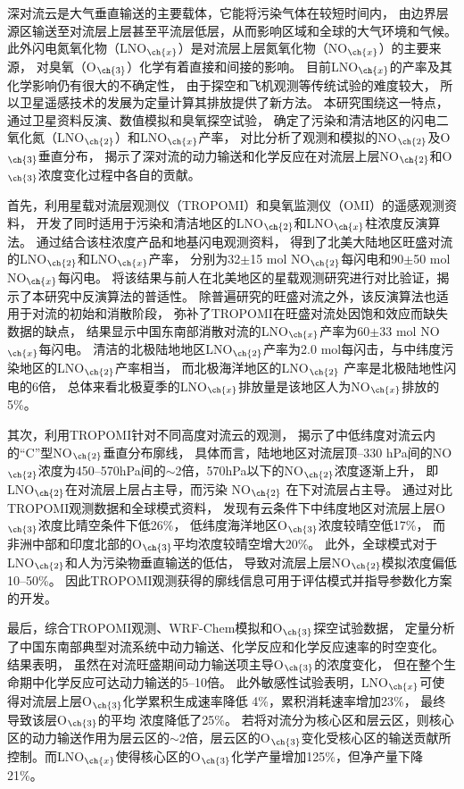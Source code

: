 
\abstract
{
深对流云是大气垂直输送的主要载体，它能将污染气体在较短时间内，
由边界层源区输送至对流层上层甚至平流层低层，从而影响区域和全球的大气环境和气候。
此外闪电氮氧化物（LNO$_{\ch{x}}$）是对流层上层氮氧化物（NO$_{\ch{x}}$）的主要来源，
对臭氧（O$_{\ch{3}}$）化学有着直接和间接的影响。
目前LNO$_{\ch{x}}$的产率及其化学影响仍有很大的不确定性，
由于探空和飞机观测等传统试验的难度较大，
所以卫星遥感技术的发展为定量计算其排放提供了新方法。
本研究围绕这一特点，通过卫星资料反演、数值模拟和臭氧探空试验，
确定了污染和清洁地区的闪电二氧化氮（LNO$_{\ch{2}}$）和LNO$_{\ch{x}}$产率，
对比分析了观测和模拟的NO$_{\ch{2}}$及O$_{\ch{3}}$垂直分布，
揭示了深对流的动力输送和化学反应在对流层上层NO$_{\ch{2}}$和O$_{\ch{3}}$浓度变化过程中各自的贡献。

首先，利用星载对流层观测仪（TROPOMI）和臭氧监测仪（OMI）的遥感观测资料，
开发了同时适用于污染和清洁地区的LNO$_{\ch{2}}$和LNO$_{\ch{x}}$柱浓度反演算法。
通过结合该柱浓度产品和地基闪电观测资料，
得到了北美大陆地区旺盛对流的LNO$_{\ch{2}}$和LNO$_{\ch{x}}$产率，
分别为32$\pm$15 mol NO$_{\ch{2}}$每闪电和90$\pm$50 mol NO$_{\ch{x}}$每闪电。
将该结果与前人在北美地区的星载观测研究进行对比验证，揭示了本研究中反演算法的普适性。
除普遍研究的旺盛对流之外，该反演算法也适用于对流的初始和消散阶段，
弥补了TROPOMI在旺盛对流处因饱和效应而缺失数据的缺点，
结果显示中国东南部消散对流的LNO$_{\ch{x}}$产率为60$\pm$33 mol NO$_{\ch{x}}$每闪电。
清洁的北极陆地地区LNO$_{\ch{2}}$产率为2.0 mol每闪击，与中纬度污染地区的LNO$_{\ch{2}}$产率相当，
而北极海洋地区的LNO$_{\ch{2}}$ 产率是北极陆地性闪电的6倍，
总体来看北极夏季的LNO$_{\ch{x}}$排放量是该地区人为NO$_{\ch{x}}$排放的5\%。

其次，利用TROPOMI针对不同高度对流云的观测，
揭示了中低纬度对流云内的“C”型NO$_{\ch{2}}$垂直分布廓线，
具体而言，陆地地区对流层顶--330 hPa间的NO$_{\ch{2}}$浓度为450--570hPa间的$\sim$2倍，570hPa以下的NO$_{\ch{2}}$浓度逐渐上升，
即LNO$_{\ch{2}}$在对流层上层占主导，而污染 NO$_{\ch{2}}$ 在下对流层占主导。
通过对比TROPOMI观测数据和全球模式资料，
发现有云条件下中纬度地区对流层上层O$_{\ch{3}}$浓度比晴空条件下低26\%，
低纬度海洋地区O$_{\ch{3}}$浓度较晴空低17\%，
而非洲中部和印度北部的O$_{\ch{3}}$平均浓度较晴空增大20\%。
此外，全球模式对于LNO$_{\ch{2}}$和人为污染物垂直输送的低估，
导致对流层上层NO$_{\ch{2}}$模拟浓度偏低10--50\%。
因此TROPOMI观测获得的廓线信息可用于评估模式并指导参数化方案的开发。

最后，综合TROPOMI观测、WRF-Chem模拟和O$_{\ch{3}}$探空试验数据，
定量分析了中国东南部典型对流系统中动力输送、化学反应和化学反应速率的时空变化。
结果表明，
虽然在对流旺盛期间动力输送项主导O$_{\ch{3}}$的浓度变化，
但在整个生命期中化学反应可达动力输送的5--10倍。
此外敏感性试验表明，LNO$_{\ch{x}}$可使得对流层上层O$_{\ch{3}}$化学累积生成速率降低 4\%，累积消耗速率增加23\%，
最终导致该层O$_{\ch{3}}$的平均 浓度降低了25\%。
若将对流分为核心区和层云区，则核心区的动力输送作用为层云区的$\sim$2倍，层云区的O$_{\ch{3}}$变化受核心区的输送贡献所控制。而LNO$_{\ch{x}}$使得核心区的O$_{\ch{3}}$化学产量增加125\%，但净产量下降21\%。
}
